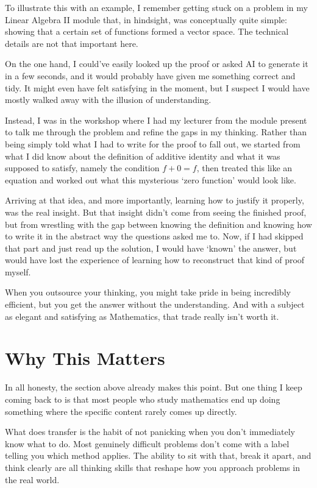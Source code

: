 To illustrate this with an example, I remember getting stuck on a problem in my Linear Algebra II module that, in hindsight, was conceptually quite simple: showing that a certain set of functions formed a vector space. The technical details are not that important here.

On the one hand, I could've easily looked up the proof or asked AI to generate it in a few seconds, and it would probably have given me something correct and tidy. It might even have felt satisfying in the moment, but I suspect I would have mostly walked away with the illusion of understanding. 

Instead, I was in the workshop where I had my lecturer from the module present to talk me through the problem and refine the gaps in my thinking. Rather than being simply told what I had to write for the proof to fall out, we started from what I did know about the definition of additive identity and what it was supposed to satisfy, namely the condition $f +0 =f$, then treated this like an equation and worked out what this mysterious `zero function' would look like. 

Arriving at that idea, and more importantly, learning how to justify it properly, was the real insight. But that insight didn't come from seeing the finished proof, but from wrestling with the gap between knowing the definition and knowing how to write it in the abstract way the questions asked me to. Now, if I had skipped that part and just read up the solution, I would have `known' the answer, but would have lost the experience of learning how to reconstruct that kind of proof myself. 

When you outsource your thinking, you might take pride in being incredibly efficient, but you get the answer without the understanding. And with a subject as elegant and satisfying as Mathematics, that trade really isn't worth it. 

\section{Why This Matters}

In all honesty, the section above already makes this point. But one thing I keep coming back to is that most people who study mathematics end up doing something where the specific content rarely comes up directly. 

What does transfer is the habit of not panicking when you don't immediately know what to do. Most genuinely difficult problems don't come with a label telling you which method applies. The ability to sit with that, break it apart, and think clearly are all thinking skills that reshape how you approach problems in the real world. 


